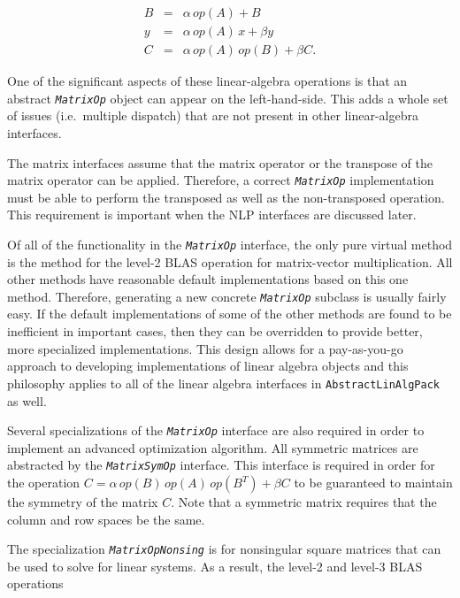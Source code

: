 \documentclass[pdf,12pt,report]{SANDreport}
\begin{document}
{\bsinglespace
\begin{eqnarray*}
B & = & \alpha \, op(A) + B \\
y & = & \alpha \, op(A) \,  x + \beta y \\
C & = & \alpha \, op(A) \, op(B) + \beta C.
\end{eqnarray*}
\esinglespace}

One of the significant aspects of these linear-algebra operations is
that an abstract {}\texttt{\textit{Matrix\-Op}} object can appear on
the left-hand-side.  This adds a whole set of issues (i.e.\ multiple
dispatch) that are not present in other linear-algebra interfaces.

The matrix interfaces assume that the matrix operator or the transpose
of the matrix operator can be applied.  Therefore, a correct
{}\texttt{\textit{Matrix\-Op}} implementation must be able to perform
the transposed as well as the non-transposed operation.  This
requirement is important when the NLP interfaces are discussed later.

Of all of the functionality in the {}\texttt{\textit{Matrix\-Op}} interface,
the only pure virtual method is the method for the level-2 BLAS operation for
matrix-vector multiplication.  All other methods have reasonable default
implementations based on this one method.  Therefore, generating a new
concrete {}\texttt{\textit{Matrix\-Op}} subclass is usually fairly easy.  If
the default implementations of some of the other methods are found to be
inefficient in important cases, then they can be overridden to provide better,
more specialized implementations.  This design allows for a pay-as-you-go
approach to developing implementations of linear algebra objects and this
philosophy applies to all of the linear algebra interfaces in
{}\texttt{Abstract\-Lin\-Alg\-Pack} as well.

Several specializations of the {}\texttt{\textit{Matrix\-Op}} interface are
also required in order to implement an advanced optimization algorithm.  All
symmetric matrices are abstracted by the {}\texttt{\textit{Matrix\-Sym\-Op}}
interface.  This interface is required in order for the operation $C =
\alpha\,op(B)\,op(A)\,op(B^T) + \beta C$ to be guaranteed to maintain the
symmetry of the matrix $C$.  Note that a symmetric matrix requires that the
column and row spaces be the same.

The specialization {}\texttt{\textit{Matrix\-Op\-Nonsing}} is
for nonsingular square matrices that can be used to solve for linear
systems.  As a result, the level-2 and level-3 BLAS operations
\end{document}
